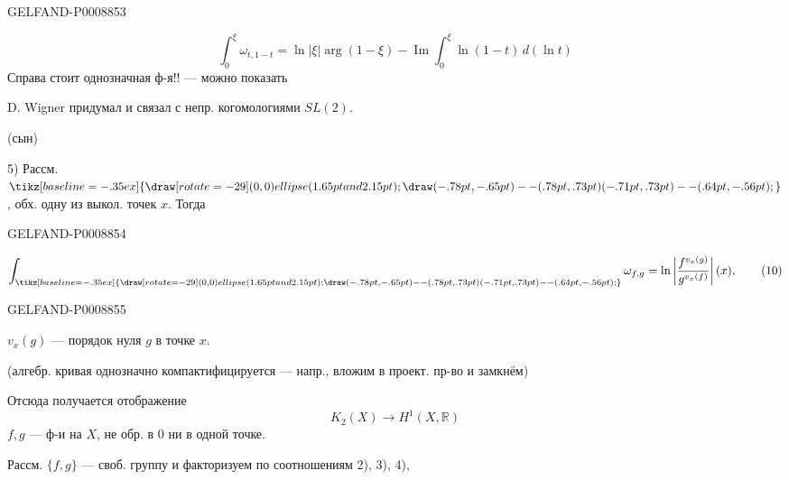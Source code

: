 \begin{GelfandAdjacentEvidence}{GELFAND-P000885}{3}

\begin{equation*}
\int_0^\xi\omega_{t,1-t}=\ln|\xi|\arg(1-\xi)-\operatorname{Im}\int_0^\xi\ln(1-t)\,d(\ln t)
\tag{9}
\end{equation*}
Справа стоит однозначная ф-я!! --- можно показать

D. Wigner придумал и связал с непр. когомологиями $SL(2)$.

(сын)

5) Рассм. $\mathord{\tikz[baseline=-.35ex]{\draw[rotate=-29] (0,0) ellipse (1.65pt and 2.15pt);\draw (-.78pt,-.65pt)--(.78pt,.73pt) (-.71pt,.73pt)--(.64pt,-.56pt);}}$,
обх. одну из выкол. точек $x$. Тогда
\end{GelfandAdjacentEvidence}
\begin{GelfandAdjacentEvidence}{GELFAND-P000885}{4}

\begin{equation*}
\int_{\mathord{\tikz[baseline=-.35ex]{\draw[rotate=-29] (0,0) ellipse (1.65pt and 2.15pt);\draw (-.78pt,-.65pt)--(.78pt,.73pt) (-.71pt,.73pt)--(.64pt,-.56pt);}}}
\omega_{f,g}=\ln\left|\frac{f^{v_x(g)}}{g^{v_x(f)}}\right|(x),
\tag{10}
\end{equation*}
\end{GelfandAdjacentEvidence}
\begin{GelfandAdjacentEvidence}{GELFAND-P000885}{5}


$v_x(g)$ --- порядок нуля $g$ в точке $x$.

(алгебр. кривая однозначно компактифицируется --- напр., вложим в проект. пр-во и замкнём)

Отсюда получается отображение
\begin{equation*}
K_2(X)\to H^1(X,\mathbb R)
\tag{11}
\end{equation*}
$f,g$ --- ф-и на $X$, не обр. в $0$ ни в одной точке.

Рассм. $\{f,g\}$ --- своб. группу и факторизуем по соотношениям 2), 3), 4),
\end{GelfandAdjacentEvidence}



